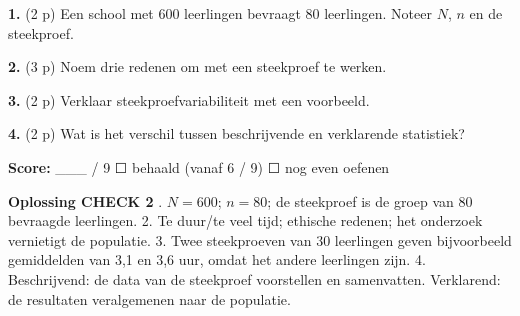 \textbf{1.} (2 p) Een school met 600 leerlingen bevraagt 80 leerlingen. Noteer $N$, $n$ en de steekproef. \lijn

\textbf{2.} (3 p) Noem drie redenen om met een steekproef te werken. \lijn

\textbf{3.} (2 p) Verklaar steekproefvariabiliteit met een voorbeeld. \lijn

\textbf{4.} (2 p) Wat is het verschil tussen beschrijvende en verklarende statistiek? \lijn

\begin{doel}
\textbf{Score:} \_\_\_ / 9 \quad ☐ behaald (vanaf 6 / 9) \quad ☐ nog even oefenen
\end{doel}

\begin{oplossing}
\textbf{Oplossing CHECK 2} . $N=600$; $n=80$; de steekproef is de groep van 80 bevraagde leerlingen. 2. Te duur/te veel tijd; ethische redenen; het onderzoek vernietigt de populatie. 3. Twee steekproeven van 30 leerlingen geven bijvoorbeeld gemiddelden van 3,1 en 3,6 uur, omdat het andere leerlingen zijn. 4. Beschrijvend: de data van de steekproef voorstellen en samenvatten. Verklarend: de resultaten veralgemenen naar de populatie.
\end{oplossing}
